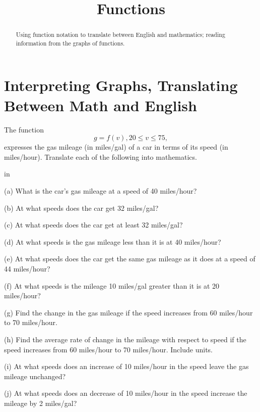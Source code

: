 \documentclass{ximera}
\title{Functions}
\newcommand{\pskip}{\vskip 0.1 in}
\begin{document}
\begin{abstract}
Using function notation to translate between English and mathematics; reading information from the graphs of functions.
\end{abstract}
\maketitle

\section{Interpreting Graphs, Translating Between Math and English}

\begin{example}  \label{ExFun1}

The function
\[
   g = f(v) , 20 \leq v \leq 75 ,
\]
expresses the gas mileage (in miles/gal) of a car in terms of its speed (in miles/hour). Translate each of the following into mathematics.

\pskip


\noindent (a) What is the car's gas mileage at a speed of 40 miles/hour?

\noindent (b) At what speeds does the car get 32 miles/gal?

\noindent (c) At what speeds does the car get at least 32 miles/gal?

\noindent (d) At what speeds is the gas mileage less than it is at 40 miles/hour?

\noindent (e) At what speeds does the car get the same gas mileage as it does at a speed of 44 miles/hour?

\noindent (f) At what speeds is the mileage 10 miles/gal greater than it is at 20 miles/hour?

\noindent (g) Find the change in the gas mileage if the speed increases from 60 miles/hour to 70 miles/hour.

\noindent (h) Find the average rate of change in the mileage with respect to speed if the speed increases from 60 miles/hour to 70 miles/hour. Include units.

\noindent (i) At what speeds does an increase of 10 miles/hour in the speed leave the gas mileage unchanged?

\noindent (j) At what speeds does an decrease of 10 miles/hour in the speed increase the mileage by 2 miles/gal?

\end{example}
\end{document}
